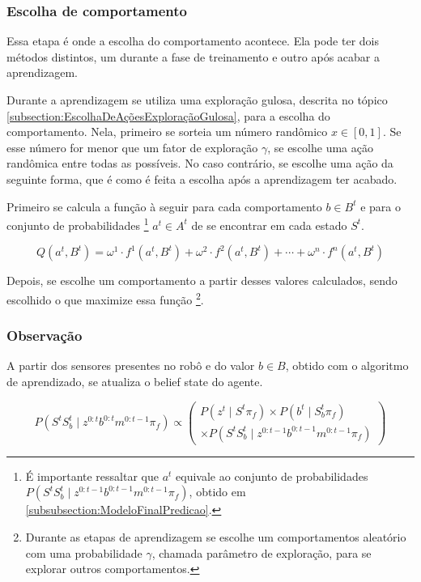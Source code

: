 \subsubsection{Escolha de comportamento}

Essa etapa é onde a escolha do comportamento acontece. Ela pode ter dois métodos distintos, um durante a fase de treinamento e outro após acabar a aprendizagem.

Durante a aprendizagem se utiliza uma exploração gulosa, descrita no tópico \ref{subsection:EscolhaDeAçõesExploraçãoGulosa}, para a escolha do comportamento. Nela, primeiro se sorteia um número randômico $ x \in [0,1] $. Se esse número for menor que um fator de exploração $ \gamma $, se escolhe uma ação randômica entre todas as possíveis. No caso contrário, se escolhe uma ação da seguinte forma, que é como é feita a escolha após a aprendizagem ter acabado.

Primeiro se calcula a função à seguir para cada comportamento $ b \in B^t $ e para o conjunto de probabilidades%
\footnote{É importante ressaltar que $ a^t $ equivale ao conjunto de probabilidades $ P \left( S^t S_b^t \mid z^{0: t-1} b^{0: t-1} m^{0: t-1} \pi_f \right) $, obtido em \ref{subsubsection:ModeloFinalPredicao}.%
} $ a^t \in A^t $ de se encontrar em cada estado $ S^t $.

\begin{equation}
    	Q \left( a^t, B^t \right) = \omega^1 \cdot f^1 \left( a^t, B^t \right) + \omega^2 \cdot f^2 \left( a^t, B^t \right) + \cdots + \omega^n \cdot f^n \left( a^t, B^t \right)
\end{equation}

Depois, se escolhe um comportamento a partir desses valores calculados, sendo escolhido o que maximize essa função%
\footnote{Durante as etapas de aprendizagem se escolhe um comportamentos aleatório com uma probabilidade $ \gamma $, chamada parâmetro de exploração, para se explorar outros comportamentos.}.


\subsubsection{Observação}

A partir dos sensores presentes no robô e do valor $ b \in B $, obtido com o algoritmo de aprendizado, se atualiza o belief state do agente.

\begin{equation}
    P \left( S^t S_b^t \mid z^{0: t} b^{0: t} m^{0: t-1} \pi_f \right) \propto
        \left(
            \begin{array}{l}
                P \left( z^t \mid S^t \pi_f \right) \times P \left( b^t \mid S_b^t \pi_f \right) \\
                \times P \left( S^t S_b^t \mid z^{0: t-1} b^{0: t-1} m^{0: t-1} \pi_f \right)
            \end{array}
        \right)
\end{equation}


